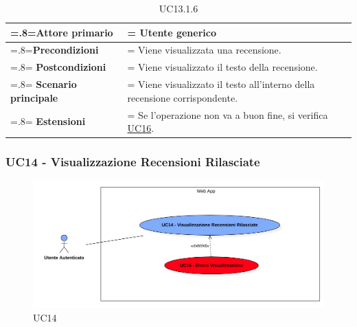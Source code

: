             \begin{table}[H]
                \centering
                \renewcommand{\arraystretch}{1.8}
                \renewcommand\tabularxcolumn[1]{m{#1}}
                \begin{tabularx}{0.9\textwidth} {
                    >{\hsize=.8\hsize\linewidth=\hsize}X
                    >{\hsize=1.2\hsize\linewidth=\hsize}X}
                    \hline
                    \textbf{Attore primario} & Utente generico \\
                    \hline
                    \textbf{Precondizioni} & Viene visualizzata una recensione. \\
                    \hline
                    \textbf{Postcondizioni} & Viene visualizzato il testo della recensione. \\
                    \hline
                    \textbf{Scenario principale} & Viene visualizzato il testo all'interno della recensione corrispondente. \\
                    \hline
                    \textbf{Estensioni} & Se l'operazione non va a buon fine, si verifica \hyperref[UC16]{UC16}. \\
                    \hline
                \end{tabularx}
                \caption{UC13.1.6}
            \end{table}

        \subsubsection{UC14 - Visualizzazione Recensioni Rilasciate}
        \label{UC14}

            \begin{figure}[H]
                \centering
                \includegraphics[scale=0.4]{src/img/UC14.png}
                \caption{UC14}
            \end{figure}

